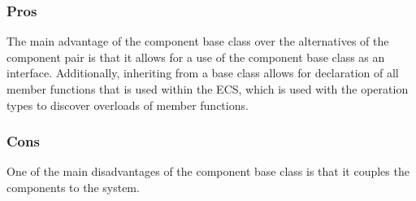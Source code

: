 
\subsubsection{Pros}
The main advantage of the component base class over the alternatives of the component pair is that it allows
for a use of the component base class as an interface.
Additionally, inheriting from a base class allows for declaration of all member functions that is used within the ECS,
which is used with the operation types to discover overloads of member functions.

\subsubsection{Cons}
One of the main disadvantages of the component base class is that it couples the components to the system.
